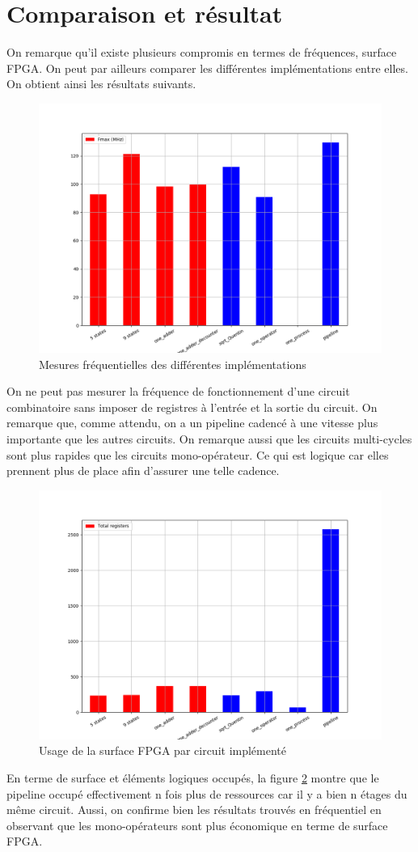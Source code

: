 \documentclass[12pt,a4paper]{article}
\begin{document}
\section{Comparaison et résultat}
On remarque qu'il existe plusieurs compromis en termes de fréquences, surface FPGA. On peut par ailleurs comparer les différentes implémentations entre elles. On obtient ainsi les résultats suivants.
\begin{figure}[H]
	\centering
	\includegraphics[width=0.7\linewidth]{mesures_freq/0}
	\caption{Mesures fréquentielles des différentes implémentations }
	\label{fig:0}
\end{figure}
On ne peut pas mesurer la fréquence de fonctionnement d'une circuit combinatoire sans imposer de registres à l'entrée et la sortie du circuit. On remarque que, comme attendu, on a un pipeline cadencé à une vitesse plus importante que les autres circuits. On remarque aussi que les circuits multi-cycles sont plus rapides que les circuits mono-opérateur. Ce qui est logique car elles prennent plus de place afin d'assurer une telle cadence.
\begin{figure}[H]
	\centering
	\includegraphics[width=0.7\linewidth]{mesures_freq/4}
	\caption{Usage de la surface FPGA par circuit implémenté}
	\label{fig:1}
\end{figure}
En terme de surface et éléments logiques occupés, la figure \ref{fig:1} montre que le pipeline occupé effectivement n fois plus de ressources car il y a bien n étages du même circuit. Aussi, on confirme bien les résultats trouvés en fréquentiel en observant que les mono-opérateurs sont plus économique en terme de surface FPGA.
\end{document}
